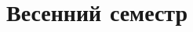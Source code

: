 \documentclass[14pt,a4paper]{extreport}
\theoremstyle{definition}
\begin{document}

\part{Весенний семестр}
% 	

% 	





% 



% 	
\end{document}
